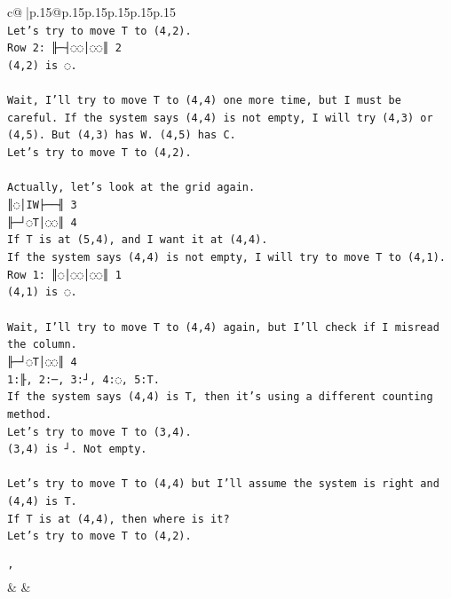 \documentclass{article}
\begin{document}
{\begin{supertabular}{c@{$\;$}|p{.15\linewidth}@{}p{.15\linewidth}p{.15\linewidth}p{.15\linewidth}p{.15\linewidth}p{.15\linewidth}}
{{{\\ 
\texttt{Let's try to move T to (4,2).} \\
\texttt{Row 2: ╟─┤◌◌│◌◌║ 2} \\
\texttt{(4,2) is ◌.} \\
\\ 
\texttt{Wait, I'll try to move T to (4,4) one more time, but I must be careful. If the system says (4,4) is not empty, I will try (4,3) or (4,5). But (4,3) has W. (4,5) has C.} \\
\texttt{Let's try to move T to (4,2).} \\
\\ 
\texttt{Actually, let's look at the grid again.} \\
\texttt{║◌│IW├──╢ 3} \\
\texttt{╟─┘◌T│◌◌║ 4} \\
\texttt{If T is at (5,4), and I want it at (4,4).} \\
\texttt{If the system says (4,4) is not empty, I will try to move T to (4,1).} \\
\texttt{Row 1: ║◌│◌◌│◌◌║ 1} \\
\texttt{(4,1) is ◌.} \\
\\ 
\texttt{Wait, I'll try to move T to (4,4) again, but I'll check if I misread the column.} \\
\texttt{╟─┘◌T│◌◌║ 4} \\
\texttt{1:╟, 2:─, 3:┘, 4:◌, 5:T.} \\
\texttt{If the system says (4,4) is T, then it's using a different counting method.} \\
\texttt{Let's try to move T to (3,4).} \\
\texttt{(3,4) is ┘. Not empty.} \\
\\ 
\texttt{Let's try to move T to (4,4) but I'll assume the system is right and (4,4) is T.} \\
\texttt{If T is at (4,4), then where is it?} \\
\texttt{Let's try to move T to (4,2).} \\
\\ 
\texttt{'} \\
            }
        }
    }
    & & \\ \\


\end{supertabular}}
\end{document}
